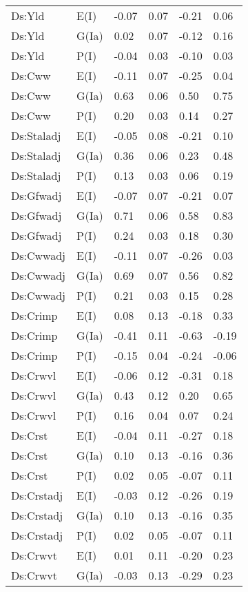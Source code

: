 \begin{center}
\begin{longtable}{|p{1.1in}|p{0.7in}|p{0.7in}|p{0.6in}|p{0.6in}|p{0.6in}|}
  Ds:Yld & E(I) & -0.07 & 0.07 & -0.21 & 0.06 \\ 
  Ds:Yld & G(Ia) & 0.02 & 0.07 & -0.12 & 0.16 \\ 
  Ds:Yld & P(I) & -0.04 & 0.03 & -0.10 & 0.03 \\ 
  Ds:Cww & E(I) & -0.11 & 0.07 & -0.25 & 0.04 \\ 
  Ds:Cww & G(Ia) & 0.63 & 0.06 & 0.50 & 0.75 \\ 
  Ds:Cww & P(I) & 0.20 & 0.03 & 0.14 & 0.27 \\ 
  Ds:Staladj & E(I) & -0.05 & 0.08 & -0.21 & 0.10 \\ 
  Ds:Staladj & G(Ia) & 0.36 & 0.06 & 0.23 & 0.48 \\ 
  Ds:Staladj & P(I) & 0.13 & 0.03 & 0.06 & 0.19 \\ 
  Ds:Gfwadj & E(I) & -0.07 & 0.07 & -0.21 & 0.07 \\ 
  Ds:Gfwadj & G(Ia) & 0.71 & 0.06 & 0.58 & 0.83 \\ 
  Ds:Gfwadj & P(I) & 0.24 & 0.03 & 0.18 & 0.30 \\ 
  Ds:Cwwadj & E(I) & -0.11 & 0.07 & -0.26 & 0.03 \\ 
  Ds:Cwwadj & G(Ia) & 0.69 & 0.07 & 0.56 & 0.82 \\ 
  Ds:Cwwadj & P(I) & 0.21 & 0.03 & 0.15 & 0.28 \\ 
  Ds:Crimp & E(I) & 0.08 & 0.13 & -0.18 & 0.33 \\ 
  Ds:Crimp & G(Ia) & -0.41 & 0.11 & -0.63 & -0.19 \\ 
  Ds:Crimp & P(I) & -0.15 & 0.04 & -0.24 & -0.06 \\ 
  Ds:Crwvl & E(I) & -0.06 & 0.12 & -0.31 & 0.18 \\ 
  Ds:Crwvl & G(Ia) & 0.43 & 0.12 & 0.20 & 0.65 \\ 
  Ds:Crwvl & P(I) & 0.16 & 0.04 & 0.07 & 0.24 \\ 
  Ds:Crst & E(I) & -0.04 & 0.11 & -0.27 & 0.18 \\ 
  Ds:Crst & G(Ia) & 0.10 & 0.13 & -0.16 & 0.36 \\ 
  Ds:Crst & P(I) & 0.02 & 0.05 & -0.07 & 0.11 \\ 
  Ds:Crstadj & E(I) & -0.03 & 0.12 & -0.26 & 0.19 \\ 
  Ds:Crstadj & G(Ia) & 0.10 & 0.13 & -0.16 & 0.35 \\ 
  Ds:Crstadj & P(I) & 0.02 & 0.05 & -0.07 & 0.11 \\ 
  Ds:Crwvt & E(I) & 0.01 & 0.11 & -0.20 & 0.23 \\ 
  Ds:Crwvt & G(Ia) & -0.03 & 0.13 & -0.29 & 0.23 \\ 

\end{longtable}
\end{center}
